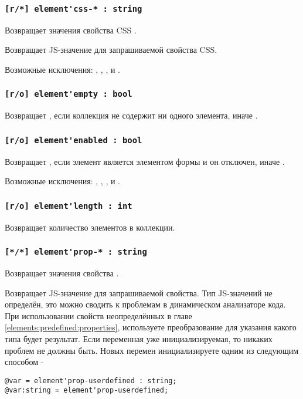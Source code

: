 \subsubsection{\lstinline|[r/*] element'css-* : string|}

\code{[w3c]} Возвращает значения свойства CSS \code{*}.

\code{[icL]} Возвращает JS-значение для запрашиваемой свойства CSS.

Возможные исключения: , , ,  и .

\subsubsection{\lstinline|[r/o] element'empty : bool|}

Возвращает \true, если коллекция не содержит ни одного элемента, иначе \false.

\subsubsection{\lstinline|[r/o] element'enabled : bool|}

Возвращает \false, если элемент является элементом формы и он отключен, иначе \true. 

Возможные исключения: , , ,  и .

\subsubsection{\lstinline|[r/o] element'length : int|}

Возвращает количество элементов в коллекции.

\subsubsection{\lstinline|[*/*] element'prop-* : string|}

\code{[w3c]} Возвращает значения свойства \code{*}.

\code{[icL]}  Возвращает JS-значение для запрашиваемой свойства. Тип JS-значений не определён, это можно сводить к проблемам в динамическом анализаторе кода. При использовании свойств неопределённых в главе \ref{elements:predefined:properties}, используете преобразование для указания какого типа будет результат. Если переменная уже инициализируемая, то никаких проблем не должны быть. Новых перемен инициализируете одним из следующим способом -
\begin{lstlisting}[numbers=none]
@var = element'prop-userdefined : string;
@var:string = element'prop-userdefined;
\end{lstlisting}

